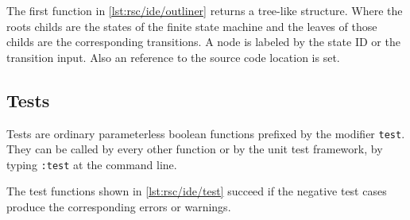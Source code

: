 The first function in \autoref{lst:rsc/ide/outliner} returns a tree-like structure.
Where the roots childs are the states of the finite state machine and the leaves of those childs are the corresponding transitions.
A node is labeled by the state ID or the transition input.
Also an reference to the source code location is set.




\subsection{Tests}

Tests are ordinary parameterless boolean functions prefixed by the modifier \lstinline[language=rascal]{test}.
They can be called by every other function or by the unit test framework, by typing \texttt{:test} at the command line.

The test functions shown in \autoref{lst:rsc/ide/test} succeed if the negative test cases produce the corresponding errors or warnings.


